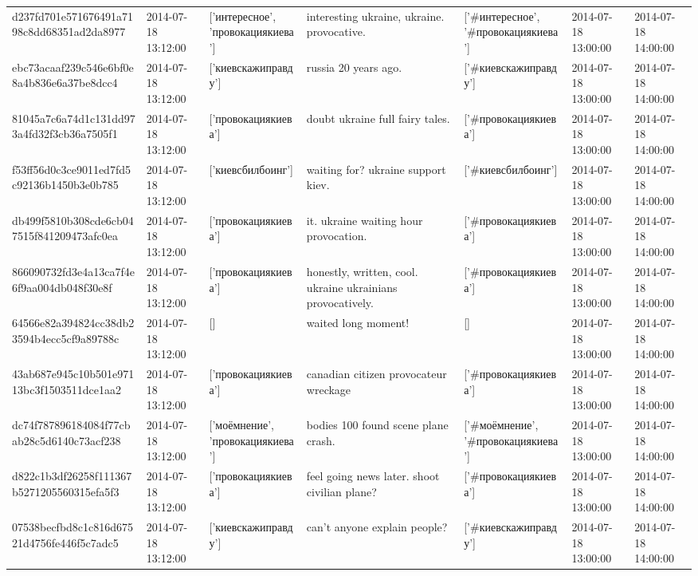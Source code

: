 \begin{tabular}{lllllll}
d237fd701e571676491a7198c8dd68351ad2da8977 & 2014-07-18 13:12:00 & ['интересное', 'провокациякиева'] & interesting ukraine, ukraine. provocative. & ['#интересное', '#провокациякиева'] & 2014-07-18 13:00:00 & 2014-07-18 14:00:00 \\
ebc73acaaf239c546e6bf0e8a4b836e6a37be8dcc4 & 2014-07-18 13:12:00 & ['киевскажиправду'] & russia 20 years ago. & ['#киевскажиправду'] & 2014-07-18 13:00:00 & 2014-07-18 14:00:00 \\
81045a7c6a74d1c131dd973a4fd32f3cb36a7505f1 & 2014-07-18 13:12:00 & ['провокациякиева'] & doubt ukraine full fairy tales. & ['#провокациякиева'] & 2014-07-18 13:00:00 & 2014-07-18 14:00:00 \\
f53ff56d0c3ce9011ed7fd5c92136b1450b3e0b785 & 2014-07-18 13:12:00 & ['киевсбилбоинг'] & waiting for? ukraine support kiev. & ['#киевсбилбоинг'] & 2014-07-18 13:00:00 & 2014-07-18 14:00:00 \\
db499f5810b308cde6cb047515f841209473afc0ea & 2014-07-18 13:12:00 & ['провокациякиева'] & it. ukraine waiting hour provocation. & ['#провокациякиева'] & 2014-07-18 13:00:00 & 2014-07-18 14:00:00 \\
866090732fd3e4a13ca7f4e6f9aa004db048f30e8f & 2014-07-18 13:12:00 & ['провокациякиева'] & honestly, written, cool. ukraine ukrainians provocatively. & ['#провокациякиева'] & 2014-07-18 13:00:00 & 2014-07-18 14:00:00 \\
64566e82a394824cc38db23594b4ecc5cf9a89788c & 2014-07-18 13:12:00 & [] & waited long moment! & [] & 2014-07-18 13:00:00 & 2014-07-18 14:00:00 \\
43ab687e945c10b501e97113bc3f1503511dce1aa2 & 2014-07-18 13:12:00 & ['провокациякиева'] & canadian citizen provocateur wreckage & ['#провокациякиева'] & 2014-07-18 13:00:00 & 2014-07-18 14:00:00 \\
dc74f787896184084f77cbab28c5d6140c73acf238 & 2014-07-18 13:12:00 & ['моёмнение', 'провокациякиева'] & bodies 100 found scene plane crash. & ['#моёмнение', '#провокациякиева'] & 2014-07-18 13:00:00 & 2014-07-18 14:00:00 \\
d822c1b3df26258f111367b5271205560315efa5f3 & 2014-07-18 13:12:00 & ['провокациякиева'] & feel going news later. shoot civilian plane? & ['#провокациякиева'] & 2014-07-18 13:00:00 & 2014-07-18 14:00:00 \\
07538becfbd8c1c816d67521d4756fe446f5c7adc5 & 2014-07-18 13:12:00 & ['киевскажиправду'] & can't anyone explain people? & ['#киевскажиправду'] & 2014-07-18 13:00:00 & 2014-07-18 14:00:00 \\

\end{tabular}
